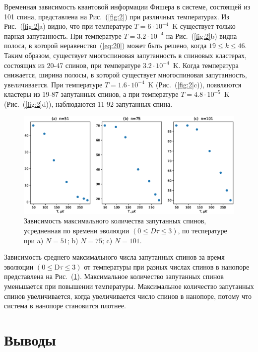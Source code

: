 \documentclass[utf8]{jetp}
\begin{document}
Временная зависимость квантовой информации Фишера в системе, состоящей из 101 спина, представлена на Рис.~(\ref{fig:2}) при различных температурах.
Из Рис.~(\ref{fig:2}a) видно, что при температуре $T=6\cdot10^{-4}$~K существует только парная запутанность.
При температуре $T=3.2\cdot10^{-4}$ на Рис.~(\ref{fig:2}b) видна полоса, в которой неравенство~(\ref{eq:20}) может быть решено, когда $19 \leq k \leq 46$.
Таким образом, существует многоспиновая запутанность в спиновых кластерах, состоящих из 20-47 спинов, при температуре $3.2\cdot10^{-4}$~K.
Когда температура снижается, ширина полосы, в которой существует многоспиновая запутанность, увеличивается.
При температуре $T=1.6\cdot10^{-4}$~K (Рис.~(\ref{fig:2}c)), появляются кластеры из 19-87 запутанных спинов, а при температуре $T=4.8\cdot10^{-5}$~K (Рис.~(\ref{fig:2}d)), наблюдаются 11-92 запутанных спина.

\begin{figure}
  	\includegraphics[width=0.95\linewidth]{entangled_spins_by_n.eps}
	\caption{
	    Зависимость максимального количества запутанных спинов,
	    усредненная по времени эволюции $(0 \leq D\tau \leq 3)$, 
	    по теспературе при a) $N=51$; b) $N=75$; c) $N=101$.
	}
	\label{fig:3}
\end{figure}

Зависимость среднего максимального числа запутанных спинов за время эволюции $({0}\leq \mathrm{D}\tau\leq{3})$ от температуры при разных числах спинов в нанопоре представлена на Рис.~(\ref{fig:3}).
Максимальное количество запутанных спинов уменьшается при повышении температуры.
Максимальное количество запутанных спинов увеличивается, когда увеличивается число спинов в нанопоре, потому что система в нанопоре становится плотнее.



\section{Выводы}
\label{sec:6}
\end{document}
